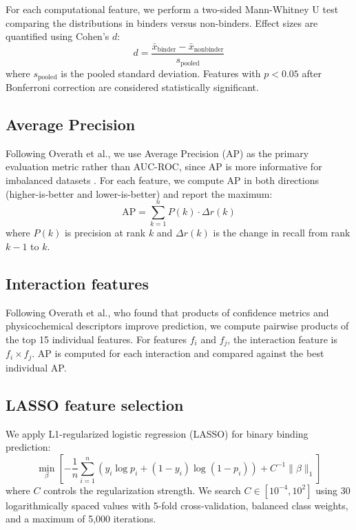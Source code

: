 \documentclass[11pt,a4paper]{article}
\newcommand{\ap}{\text{AP}}
\begin{document}
For each computational feature, we perform a two-sided Mann-Whitney U test comparing the distributions in binders versus non-binders.
Effect sizes are quantified using Cohen's $d$:
\begin{equation}
d = \frac{\bar{x}_{\text{binder}} - \bar{x}_{\text{nonbinder}}}{s_{\text{pooled}}}
\end{equation}
where $s_{\text{pooled}}$ is the pooled standard deviation.
Features with $p < 0.05$ after Bonferroni correction are considered statistically significant.

\subsection{Average Precision}

Following Overath et al., we use Average Precision (AP) as the primary evaluation metric rather than AUC-ROC, since AP is more informative for imbalanced datasets \cite{saito2015}.
For each feature, we compute AP in both directions (higher-is-better and lower-is-better) and report the maximum:
\begin{equation}
\ap = \sum_{k=1}^{n} P(k) \cdot \Delta r(k)
\end{equation}
where $P(k)$ is precision at rank $k$ and $\Delta r(k)$ is the change in recall from rank $k-1$ to $k$.

\subsection{Interaction features}

Following Overath et al., who found that products of confidence metrics and physicochemical descriptors improve prediction, we compute pairwise products of the top 15 individual features.
For features $f_i$ and $f_j$, the interaction feature is $f_i \times f_j$.
AP is computed for each interaction and compared against the best individual AP.

\subsection{LASSO feature selection}

We apply L1-regularized logistic regression (LASSO) for binary binding prediction:
\begin{equation}
\min_{\beta} \left[ -\frac{1}{n} \sum_{i=1}^{n} \left( y_i \log p_i + (1-y_i) \log(1-p_i) \right) + C^{-1} \|\beta\|_1 \right]
\end{equation}
where $C$ controls the regularization strength.
We search $C \in [10^{-4}, 10^{2}]$ using 30 logarithmically spaced values with 5-fold cross-validation, balanced class weights, and a maximum of 5,000 iterations.
\end{document}
